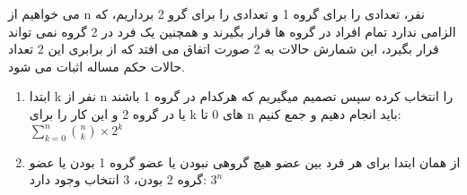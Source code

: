 \p
    می خواهیم از n نفر، تعدادی را برای گروه 1 و تعدادی را برای گرو 2 برداریم، که الزامی ندارد تمام افراد در گروه ها قرار بگیرند و همچنین یک فرد در 2 گروه نمی تواند قرار بگیرد، این شمارش حالات به 2 صورت اتفاق می افتد که از برابری این 2 تعداد حالات حکم مساله اثبات می شود.
    \begin{enumerate}
        \item 
        ابتدا k نفر از n را انتخاب کرده سپس تصمیم میگیریم که هرکدام در گروه 1 باشند یا در گروه 2 و این کار را برای k های 0 تا n باید انجام دهیم و جمع کنیم:
        \(\displaystyle\sum_{k=0}^{n} {\binom{n}{k}\times2^k}\)
        \item
        از همان ابتدا برای هر فرد بین عضو هیچ گروهی نبودن یا عضو گروه 1 بودن یا عضو گروه 2 بودن، 3 انتخاب وجود دارد:
        \(3^n\)
    \end{enumerate}